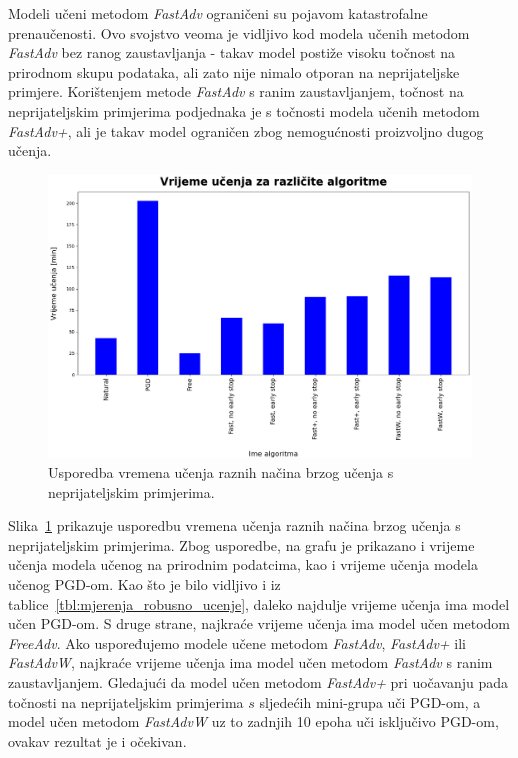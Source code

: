\documentclass[times, utf8, zavrsni, numeric]{fer}
\begin{document}
Modeli učeni metodom \textit{FastAdv} ograničeni su pojavom katastrofalne prenaučenosti. 
Ovo svojstvo veoma je vidljivo kod modela učenih metodom \textit{FastAdv} bez ranog zaustavljanja - takav model postiže visoku točnost na prirodnom skupu podataka, ali zato nije nimalo otporan na neprijateljske primjere.
Korištenjem metode \textit{FastAdv} s ranim zaustavljanjem, točnost na neprijateljskim primjerima podjednaka je s točnosti modela učenih metodom \textit{FastAdv+},
ali je takav model ograničen zbog nemogućnosti proizvoljno dugog učenja.

\pagebreak
\begin{figure}[htb]
    \centering
    \includegraphics[scale=0.42]{../stats/stats_comparison_train_time.png}
    \caption{Usporedba vremena učenja raznih načina brzog učenja s neprijateljskim primjerima.}
    \label{fig:train_time_comparison}
\end{figure}

Slika~\ref{fig:train_time_comparison} prikazuje usporedbu vremena učenja raznih načina brzog učenja s neprijateljskim primjerima.
Zbog usporedbe, na grafu je prikazano i vrijeme učenja modela učenog na prirodnim podatcima, kao i vrijeme učenja modela učenog PGD-om.
Kao što je bilo vidljivo i iz tablice~\ref{tbl:mjerenja_robusno_ucenje}, daleko najdulje vrijeme učenja ima model učen PGD-om.
S druge strane, najkraće vrijeme učenja ima model učen metodom \textit{FreeAdv}. 
Ako uspoređujemo modele učene metodom \textit{FastAdv}, \textit{FastAdv+} ili \textit{FastAdvW}, najkraće vrijeme učenja ima model učen metodom \textit{FastAdv} s ranim zaustavljanjem.
Gledajući da model učen metodom \textit{FastAdv+} pri uočavanju pada točnosti na neprijateljskim primjerima $s$ sljedećih mini-grupa uči PGD-om, 
a model učen metodom \textit{FastAdvW} uz to zadnjih 10 epoha uči isključivo PGD-om, ovakav rezultat je i očekivan.
\end{document}
